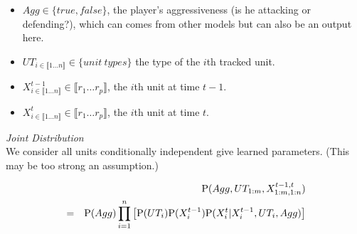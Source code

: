 \begin{itemize}
    \item $Agg \in \{true,false\}$, the player's aggressiveness (is he attacking or defending?), which can comes from other models but can also be an output here. 
    \item $UT_{i \in \llbracket 1\dots n \rrbracket} \in \{unit\ types\}$ the type of the $i$th tracked unit.
    \item $X^{t-1}_{i \in \llbracket 1\dots n \rrbracket} \in \llbracket r_1 \dots r_p \rrbracket$, the $i$th unit at time $t-1$.
    \item $X^{t}_{i \in \llbracket 1\dots n \rrbracket} \in \llbracket r_1 \dots r_p \rrbracket$, the $i$th unit at time $t$.
\end{itemize}


\vspace{0.3cm}
\textit{Joint Distribution}\\
\vspace{0.5cm}
We consider all units conditionally independent give learned parameters. (This may be too strong an assumption.) %

\begin{eqnarray}
& & \mathrm{P}(Agg, UT_{1:m}, X^{t-1,t}_{1:m,1:n}) \\
& = & \mathrm{P}(Agg)\prod_{i=1}^{n} \left[ \mathrm{P}(UT_{i}) \mathrm{P}(X^{t-1}_{i}) \mathrm{P}(X^t_{i}|X^{t-1}_{i},UT_i,Agg)\right]
\end{eqnarray}

